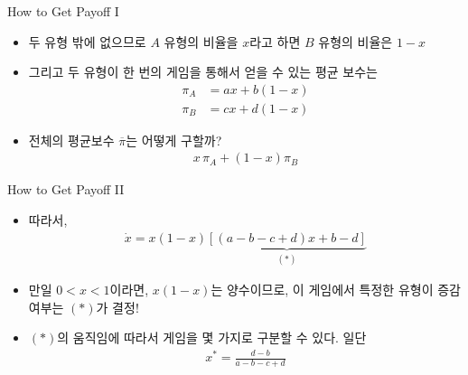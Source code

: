 \documentclass[final]{beamer}
\begin{document}
\begin{frame}[t]{How to Get Payoff I}
	\begin{itemize}
		\item 두 유형 밖에 없으므로 $A$ 유형의 비율을 $x$라고 하면 $B$ 유형의 비율은 $1-x$
		\item 그리고 두 유형이 한 번의 게임을 통해서 얻을 수 있는 평균 보수는 
		\begin{align*}
		\pi_A & = a x + b (1-x) \\
		\pi_B & = c x + d (1-x) 
		\end{align*}
		\item 전체의 평균보수 $\overline{\pi}$는 어떻게 구할까? 
		\begin{align*}
		x {\,} \pi_A + (1-x) \pi_B
		\end{align*}
	\end{itemize}
\end{frame}

\begin{frame}[t]{How to Get Payoff II}
	\begin{itemize}
	\item 따라서, 
	\begin{align*}
	\dot{x}=x(1-x)\underbrace{\left[ (a-b-c+d)x + b-d \right]}_{(\ast)}
	\end{align*}
	\item 만일 $0<x<1$이라면, $x(1-x)$는 양수이므로, 이 게임에서 특정한 유형이 증감 여부는 $(\ast)$가 결정!
	\item $(\ast)$의 움직임에 따라서 게임을 몇 가지로 구분할 수 있다. 일단
	\begin{align*}
	x^* = \frac{d-b}{a-b-c+d}
	\end{align*}
	\end{itemize}
\end{frame}
\end{document}
